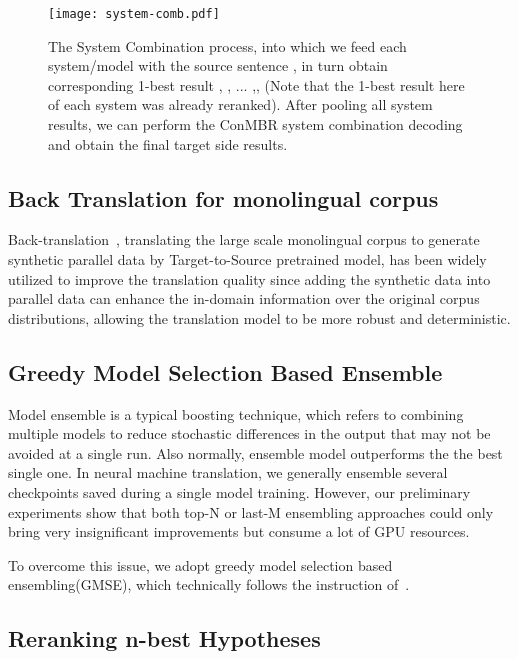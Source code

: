 \documentclass[11pt,a4paper]{article}
\begin{document}
\begin{figure}[ht]
    \centering
    \texttt{[image: system-comb.pdf]}
    \caption{The System Combination process, into which we feed each system/model with the source sentence , in turn obtain corresponding 1-best result , , ... ,, (Note that the 1-best result here of each system was already reranked). After pooling all system results, we can perform the ConMBR system combination decoding and obtain the final target side results.}
    \label{fig:system-comb}
\end{figure}

\subsection{Back Translation for monolingual corpus}

Back-translation~\cite{sennrich2015improving,bojar-etal-2018-findings}, translating the large scale monolingual corpus to generate synthetic parallel data by Target-to-Source pretrained model, has been widely utilized to improve the translation quality since adding the synthetic data into parallel data can enhance the in-domain information over the original corpus distributions, allowing the translation model to be more robust and deterministic.

\subsection{Greedy Model Selection Based Ensemble}
\label{ssec:GMSE}
Model ensemble is a typical boosting technique, which refers to combining multiple models to reduce stochastic differences in the output that may not be avoided at a single run. Also normally, ensemble model outperforms the the best single one. In neural machine translation, we generally ensemble several checkpoints saved during a single model training. However, our preliminary experiments show that both top-N or last-M ensembling approaches could only bring very insignificant improvements but consume a lot of GPU resources.

To overcome this issue, we adopt greedy model selection based ensembling(GMSE), which technically follows the instruction of~\cite{deng-etal-2018-alibabas}.

\subsection{Reranking n-best Hypotheses}
\label{ssec:rerank}
\end{document}
